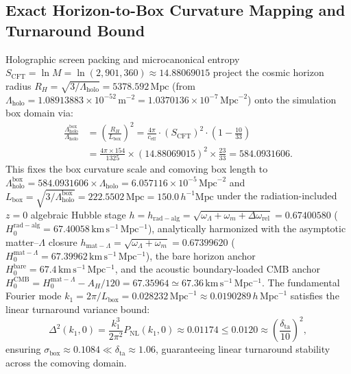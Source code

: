 \documentclass[11pt]{article}
\theoremstyle{plain}
\begin{document}
\subsection{Exact Horizon-to-Box Curvature Mapping and Turnaround Bound}
\label{app:horizon-to-box-curvature-turnaround}
Holographic screen packing and microcanonical entropy $S_{\mathrm{CFT}} = \ln M = \ln(2{,}901{,}360) \approx 14.88069015$ project the cosmic horizon radius $R_H = \sqrt{3/\Lambda_{\mathrm{holo}}} = 5378.592\,\mathrm{Mpc}$ (from $\Lambda_{\mathrm{holo}} = 1.08913883 \times 10^{-52}\,\mathrm{m}^{-2} = 1.0370136 \times 10^{-7}\,\mathrm{Mpc}^{-2}$) onto the simulation box domain via:
\begin{equation}
\begin{aligned}
\frac{\Lambda_{\mathrm{holo}}^{\mathrm{box}}}{\Lambda_{\mathrm{holo}}} &= \left(\frac{R_H}{L_{\mathrm{box}}}\right)^2 = \frac{4\pi}{c_{\mathrm{eff}}} \cdot (S_{\mathrm{CFT}})^2 \cdot \left(1 - \frac{10}{33}\right) \\
&= \frac{4\pi \times 154}{1325} \times (14.88069015)^2 \times \frac{23}{33} = 584.0931606.
\end{aligned}
\end{equation}
This fixes the box curvature scale and comoving box length to $\Lambda_{\mathrm{holo}}^{\mathrm{box}} = 584.0931606 \times \Lambda_{\mathrm{holo}} = 6.057116 \times 10^{-5}\,\mathrm{Mpc}^{-2}$ and $L_{\mathrm{box}} = \sqrt{3/\Lambda_{\mathrm{holo}}^{\mathrm{box}}} = 222.5502\,\mathrm{Mpc} = 150.0\,h^{-1}\mathrm{Mpc}$ under the radiation-included $z=0$ algebraic Hubble stage $h = h_{\mathrm{rad-alg}} = \sqrt{\omega_\Lambda + \omega_m + \Delta\omega_{\mathrm{rel}}} = 0.67400580$ ($H_0^{\mathrm{rad-alg}} = 67.40058\,\mathrm{km\,s^{-1}\,Mpc^{-1}}$), analytically harmonized with the asymptotic matter--$\Lambda$ closure $h_{\mathrm{mat-}\Lambda} = \sqrt{\omega_\Lambda + \omega_m} = 0.67399620$ ($H_0^{\mathrm{mat-}\Lambda} = 67.39962\,\mathrm{km\,s^{-1}\,Mpc^{-1}}$), the bare horizon anchor $H_0^{\mathrm{bare}} = 67.4\,\mathrm{km\,s^{-1}\,Mpc^{-1}}$, and the acoustic boundary-loaded CMB anchor $H_0^{\mathrm{CMB}} = H_0^{\mathrm{mat-}\Lambda} - A_H / 120 = 67.35964 \simeq 67.36\,\mathrm{km\,s^{-1}\,Mpc^{-1}}$. The fundamental Fourier mode $k_1 = 2\pi/L_{\mathrm{box}} = 0.028232\,\mathrm{Mpc}^{-1} \approx 0.0190289\,h\,\mathrm{Mpc}^{-1}$ satisfies the linear turnaround variance bound:
\begin{equation}
\label{eq:fundamental-mode-variance-bound}
\Delta^2(k_1, 0) = \frac{k_1^3}{2\pi^2} P_{\mathrm{NL}}(k_1, 0) \approx 0.01174 \le 0.0120 \approx \left(\frac{\delta_{\mathrm{ta}}}{10}\right)^2,
\end{equation}
ensuring $\sigma_{\mathrm{box}} \approx 0.1084 \ll \delta_{\mathrm{ta}} \approx 1.06$, guaranteeing linear turnaround stability across the comoving domain.
\end{document}
